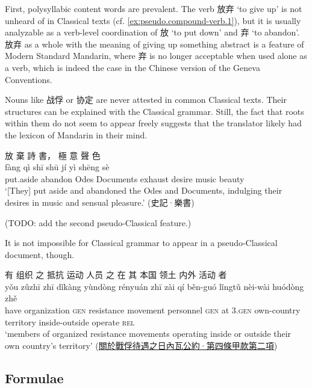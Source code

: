 \documentclass[UTF8, a4paper, oneside, scheme=plain, 12pt]{ctexrep}
\newcommand{\translate}[1]{`#1'}
\newcommand*{\category}[1]{\textsc{#1}}
\begin{document}
First, polysyllabic content words are prevalent.
The verb 放弃 \translate{to give up} is not unheard of in Classical texts (cf. \ref{ex:pseudo.compound-verb.1}),
but it is usually analyzable as a verb-level coordination of 放 \translate{to put down} and 弃 \translate{to abandon}.
放弃 as a whole with the meaning of giving up something abstract is a feature of Modern Standard Mandarin,
where 弃 is no longer acceptable when used alone as a verb,
which is indeed the case in the Chinese version of the Geneva Conventions.

Nouns like 战俘 or 协定 are never attested in common Classical texts.
Their structures can be explained with the Classical grammar.
Still, the fact that roots within them do not seem to appear freely suggests that the translator likely had the lexicon of Mandarin in their mind.

\begin{exe}
    \ex\label{ex:pseudo.compound-verb.1}
    \glll 放 棄 詩 書， 極 意 聲 色 \\
    fàng qì shī shū jí yì shēng sè \\
    put.aside abandon Odes Documents exhaust desire music beauty \\
    \glt\translate{[They] put aside and abandoned the Odes and Documents, indulging their desires in music and sensual pleasure.} \hfill (史記·樂書)
\end{exe}

(TODO: add the second pseudo-Classical feature.)

It is not impossible for Classical grammar to appear in a pseudo-Classical document, though.

\begin{exe}
    \ex
    \glll 有 组织 之 抵抗 运动 人员 之 在 其 本国 领土 内外 活动 者 \\
    yǒu zǔzhī zhī dǐkàng yùndòng rényuán zhī zài qí běn-guó lǐngtǔ nèi-wài huódòng zhě \\
    have organization \category{gen} resistance movement personnel \category{gen} at 3.\category{gen} own-country territory inside-outside operate \category{rel} \\
    \glt\translate{members of organized resistance movements operating inside or outside their own country's territory} \hfill (\href{https://www.un.org/zh/node/182215}{關於戰俘待遇之日內瓦公約·第四條甲款第二項})
\end{exe}

\subsection{Formulae}
\end{document}
